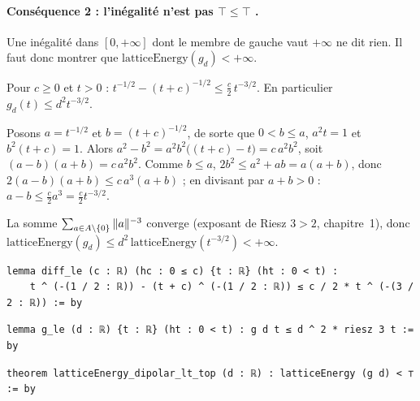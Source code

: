\paragraph{Conséquence 2 : l'inégalité n'est pas $\top\le\top$ \tierA.} Une inégalité dans $[0,+\infty]$ dont le membre
de gauche vaut $+\infty$ ne dit rien. Il faut donc montrer que $\mathrm{latticeEnergy}(g_d)<+\infty$.
\begin{lemma}\label{ch2:lem:diffle}
Pour $c\ge0$ et $t>0$ : $t^{-1/2}-(t+c)^{-1/2}\le\frac c2\,t^{-3/2}$. En particulier $g_d(t)\le d^2t^{-3/2}$.
\end{lemma}
\begin{humanproof}
Posons $a=t^{-1/2}$ et $b=(t+c)^{-1/2}$, de sorte que $0<b\le a$, $a^2t=1$ et $b^2(t+c)=1$. Alors
$a^2-b^2=a^2b^2\bigl((t+c)-t\bigr)=c\,a^2b^2$, soit $(a-b)(a+b)=c\,a^2b^2$. Comme $b\le a$, $2b^2\le a^2+ab=a(a+b)$, donc
$2(a-b)(a+b)\le c\,a^3(a+b)$ ; en divisant par $a+b>0$ : $a-b\le\frac c2a^3=\frac c2t^{-3/2}$.
\end{humanproof}
\noindent La somme $\sum_{a\in A\setminus\{0\}}\|a\|^{-3}$ converge (exposant de Riesz $3>2$, chapitre~1), donc
$\mathrm{latticeEnergy}(g_d)\le d^2\,\mathrm{latticeEnergy}(t^{-3/2})<+\infty$.
\begin{leanbox}
\begin{lstlisting}[style=chdeux]
lemma diff_le (c : ℝ) (hc : 0 ≤ c) {t : ℝ} (ht : 0 < t) :
    t ^ (-(1 / 2 : ℝ)) - (t + c) ^ (-(1 / 2 : ℝ)) ≤ c / 2 * t ^ (-(3 / 2 : ℝ)) := by
\end{lstlisting}
\begin{lstlisting}[style=chdeux]
lemma g_le (d : ℝ) {t : ℝ} (ht : 0 < t) : g d t ≤ d ^ 2 * riesz 3 t := by
\end{lstlisting}
\begin{lstlisting}[style=chdeux]
theorem latticeEnergy_dipolar_lt_top (d : ℝ) : latticeEnergy (g d) < ⊤ := by
\end{lstlisting}
\end{leanbox}


